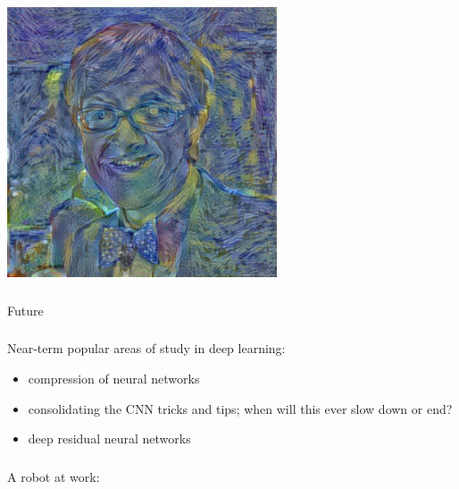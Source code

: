 \documentclass[xetex,mathserif,serif,aspectratio=169]{beamer}
\begin{document}
\begin{frame}[fragile] \frametitle{} \oldB \small

\begin{center}
\includegraphics[width=0.6\textwidth]{img/me_stary.png}
\end{center}

\end{frame}

\begin{frame}[fragile] \frametitle{} \oldB \small

\begin{flushright}
{\color{yaleblue}\sc\fontsize{1cm}{0cm}\selectfont Future}
\end{flushright}

\end{frame}

\begin{frame}[fragile] \frametitle{} \oldB \large

Near-term popular areas of study in deep learning:
\begin{itemize}
\item compression of neural networks
\item consolidating the CNN tricks and tips; when will this
ever slow down or end?
\item deep residual neural networks
\end{itemize}

\end{frame}

\begin{frame}[fragile] \frametitle{} \oldB \large

A robot at work:
\begin{center}
\end{center}

\end{frame}
\end{document}
